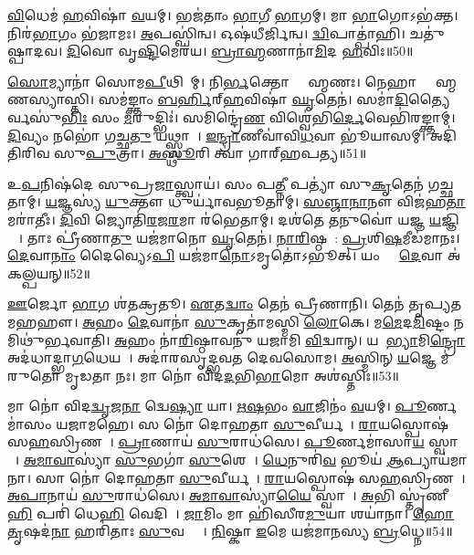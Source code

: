 \ul{𑌵𑌿}𑌧𑍇𑌮॑ \ul{𑌹}𑌵𑌿𑌷𑌾॑ \ul{𑌵}𑌯𑌮𑍍।
𑌭𑌜॑𑌤𑌾𑌂 \ul{𑌭𑌾}𑌗𑍀 \ul{𑌭𑌾}𑌗𑌮𑍍।
𑌮𑌾 \ul{𑌭𑌾}𑌗𑍋\-𑌽𑌭॑𑌕𑍍𑌤।
𑌨𑌿𑌰॑\ul{𑌭𑌾}𑌗𑌂 𑌭॑𑌜𑌾𑌮𑌃।
\ul{𑌅}𑌪𑌸𑍍𑌪𑌿॑𑌨𑍍𑌵।
𑌓𑌷॑𑌧𑍀𑌰𑍍𑌜𑌿𑌨𑍍𑌵।
\ul{𑌦𑍍𑌵𑌿}𑌪𑌾𑌤𑍍𑌪𑌾॑𑌹𑌿।
𑌚𑌤𑍁॑𑌷𑍍𑌪𑌾𑌦𑌵।
\ul{𑌦𑌿}𑌵𑍋 𑌵𑍃\ul{𑌷𑍍𑌟𑌿}𑌮𑍇𑌰॑𑌯।
\ul{𑌬𑍍𑌰𑌾}\ul{𑌹𑍍𑌮}𑌣𑌾𑌨𑌾॑\ul{𑌮𑌿}𑌦 \ul{𑌹}𑌵𑌿𑌃॥50॥

\ul{𑌸𑍋}𑌮𑍍𑌯𑌾𑌨𑌾॑ 𑌸𑍋𑌮\ul{𑌪𑍀}𑌥𑌿𑌨𑌾᳚𑌮𑍍।
𑌨𑌿\ul{𑌰𑍍𑌭}𑌕𑍍𑌤𑍋 𑌬𑍍𑌰𑌾᳚𑌹𑍍𑌮𑌣𑌃।
𑌨𑍇𑌹𑌾 𑌬𑍍𑌰𑌾᳚𑌹𑍍𑌮𑌣𑌸𑍍𑌯𑌾𑌸𑍍𑌤𑌿।
𑌸𑌮॑𑌙𑍍𑌕𑍍𑌤𑌾𑌂 \ul{𑌬}\ul{𑌰𑍍}𑌹𑌿𑌰𑍍‌\mbox{}\ul{𑌹}𑌵𑌿𑌷𑌾॑ \ul{𑌘𑍃}𑌤𑍇𑌨॑।
𑌸𑌮𑌾॑\ul{𑌦𑌿}𑌤𑍍𑌯𑍈𑌰𑍍𑌵𑌸𑍁॑\ul{𑌭𑌿𑌃} 𑌸𑌂 \ul{𑌮}𑌰𑍁𑌦𑍍𑌭𑌿𑌃॑।
𑌸𑌮𑌿𑌨𑍍𑌦𑍍𑌰𑍇॑\ul{𑌣} 𑌵𑌿𑌶𑍍𑌵𑍇॑𑌭𑌿\ul{𑌰𑍍𑌦𑍇}𑌵𑍇𑌭𑌿॑𑌰𑌙𑍍𑌕𑍍𑌤𑌾𑌮𑍍।
\ul{𑌦𑌿}𑌵𑍍𑌯𑌂 𑌨𑌭𑍋॑ 𑌗𑌚𑍍𑌛\ul{𑌤𑍁} 𑌯𑌥𑍍𑌸𑍍𑌵𑌾𑌹𑌾᳚।
\ul{𑌇}\ul{𑌨𑍍𑌦𑍍𑌰𑌾}𑌣𑍀𑌵𑌾॑𑌵𑌿\ul{𑌧}𑌵𑌾 𑌭𑍂॑𑌯𑌾𑌸𑌮𑍍।
𑌅𑌦𑌿॑𑌤𑌿𑌰𑌿𑌵 𑌸𑍁\ul{𑌪𑍁}𑌤𑍍𑌰𑌾।
\ul{𑌅}\ul{𑌸𑍍𑌥𑍂}𑌰𑌿 𑌤𑍍𑌵𑌾॑ 𑌗𑌾𑌰𑍍‌\mbox{}𑌹𑌪𑌤𑍍𑌯॥51॥

𑌉\ul{𑌪}𑌨𑌿𑌷॑𑌦𑍇 𑌸𑍁𑌪𑍍𑌰\ul{𑌜𑌾}𑌸𑍍𑌤𑍍𑌵𑌾𑌯॑।
𑌸𑌂 𑌪\ul{𑌤𑍍𑌨𑍀} 𑌪𑌤𑍍𑌯𑌾॑ 𑌸𑍁\ul{𑌕𑍃}𑌤𑍇𑌨॑ 𑌗𑌚𑍍𑌛𑌤𑌾𑌮𑍍।
\ul{𑌯}𑌜𑍍𑌞𑌸𑍍𑌯॑ \ul{𑌯𑍁}𑌕𑍍𑌤𑍗 𑌧𑍁𑌰𑍍𑌯𑌾॑𑌵𑌭𑍂𑌤𑌾𑌮𑍍।
\ul{𑌸}\ul{𑌞𑍍𑌜𑌾}\ul{𑌨𑌾}𑌨𑍗 𑌵𑌿𑌜॑𑌹\ul{𑌤𑌾}𑌮𑌰𑌾॑𑌤𑍀𑌃।
\ul{𑌦𑌿}𑌵𑌿 𑌜𑍍𑌯𑍋𑌤𑌿॑\ul{𑌰}𑌜\ul{𑌰}𑌮𑌾 𑌰॑𑌭𑍇𑌤𑌾𑌮𑍍।
𑌦𑌶॑𑌤𑍇 \ul{𑌤}𑌨𑍁𑌵𑍋॑ 𑌯𑌜𑍍𑌞 \ul{𑌯}𑌜𑍍𑌞𑌿𑌯𑌾𑌃᳚।
𑌤𑌾𑌃 𑌪𑍍𑌰𑍀॑𑌣𑌾\ul{𑌤𑍁} 𑌯𑌜॑𑌮𑌾𑌨𑍋 \ul{𑌘𑍃}𑌤𑍇𑌨॑।
\ul{𑌨𑌾}\ul{𑌰𑌿}𑌷𑍍𑌠𑌯𑍋᳚: \ul{𑌪𑍍𑌰}𑌶𑌿\ul{𑌷}𑌮𑍀𑌡॑𑌮𑌾𑌨𑌃।
\ul{𑌦𑍇}𑌵𑌾\ul{𑌨𑌾𑌂} 𑌦𑍈𑌵𑍍𑌯𑍇𑌽\ul{𑌪𑌿} 𑌯𑌜॑𑌮𑌾\ul{𑌨𑍋}\-𑌽𑌮𑍃𑌤𑍋॑\-𑌽𑌭𑍂𑌤𑍍।
𑌯𑌂 𑌵𑌾𑌂᳚ \ul{𑌦𑍇}𑌵𑌾 𑌅॑𑌕𑌲𑍍𑌪𑌯𑌨𑍍॥52॥

\ul{𑌊}𑌰𑍍𑌜𑍋 \ul{𑌭𑌾}𑌗 𑌶॑𑌤𑌕𑍍𑌰𑌤𑍂।
\ul{𑌏}𑌤\ul{𑌦𑍍𑌵𑌾𑌂} 𑌤𑍇𑌨॑ 𑌪𑍍𑌰𑍀𑌣𑌾𑌨𑌿।
𑌤𑍇𑌨॑ 𑌤𑍃𑌪𑍍𑌯𑌤𑌮𑌹𑌹𑍗।
\ul{𑌅}𑌹𑌂 \ul{𑌦𑍇}𑌵𑌾𑌨𑌾॑ \ul{𑌸𑍁}𑌕𑍃𑌤𑌾॑𑌮𑌸𑍍𑌮𑌿 \ul{𑌲𑍋}𑌕𑍇।
𑌮\ul{𑌮𑍇}𑌦\ul{𑌮𑌿}𑌷𑍍𑌟𑌂 𑌨 𑌮𑌿𑌥𑍁॑𑌰𑍍𑌭𑌵𑌾𑌤𑌿।
\ul{𑌅}𑌹𑌂 𑌨𑌾॑\ul{𑌰𑌿}𑌷𑍍𑌠𑌾𑌵𑌨𑍁॑ 𑌯𑌜𑌾𑌮𑌿 \ul{𑌵𑌿}𑌦𑍍𑌵𑌾𑌨𑍍।
𑌯𑌦𑌾᳚\ul{𑌭𑍍𑌯𑌾}𑌮𑌿\ul{𑌨𑍍𑌦𑍍𑌰𑍋} 𑌅𑌦॑𑌧𑌾𑌦𑍍𑌭𑌾\ul{𑌗}𑌧𑍇𑌯𑌮𑍍᳚।
𑌅𑌦𑌾॑𑌰𑌸𑍃𑌦𑍍𑌭𑌵𑌤 𑌦𑍇𑌵𑌸𑍋𑌮।
\ul{𑌅}𑌸𑍍𑌮𑌿𑌨𑍍 \ul{𑌯}𑌜𑍍𑌞𑍇 𑌮॑𑌰𑍁𑌤𑍋 𑌮𑍃𑌡𑌤𑌾 𑌨𑌃।
𑌮𑌾 𑌨𑍋॑ 𑌵𑌿𑌦\ul{𑌦}𑌭𑌿\ul{𑌭𑌾}𑌮𑍋 𑌅𑌶॑𑌸𑍍𑌤𑌿𑌃॥53॥

𑌮𑌾 𑌨𑍋॑ 𑌵𑌿𑌦\ul{𑌦𑍍𑌵𑍃}𑌜\ul{𑌨𑌾} 𑌦𑍍𑌵𑍇\ul{𑌷𑍍𑌯𑌾} 𑌯𑌾।
\ul{𑌋}\ul{𑌷}𑌭𑌂 \ul{𑌵𑌾}𑌜𑌿𑌨𑌂॑ \ul{𑌵}𑌯𑌮𑍍।
\ul{𑌪𑍂}𑌰𑍍𑌣𑌮𑌾॑𑌸𑌂 𑌯𑌜𑌾𑌮𑌹𑍇।
𑌸 𑌨𑍋॑ 𑌦𑍋𑌹𑌤𑌾 \ul{𑌸𑍁}𑌵𑍀𑌰𑍍𑌯𑌮𑍍᳚।
\ul{𑌰𑌾}𑌯𑌸𑍍𑌪𑍋𑌷॑ 𑌸\ul{𑌹}𑌸𑍍𑌰𑌿𑌣𑌮𑍍᳚।
\ul{𑌪𑍍𑌰𑌾}𑌣𑌾𑌯॑ \ul{𑌸𑍁}𑌰𑌾𑌧॑𑌸𑍇।
\ul{𑌪𑍂}𑌰𑍍𑌣𑌮𑌾॑𑌸𑌾\ul{𑌯} 𑌸𑍍𑌵𑌾𑌹𑌾᳚।
\ul{𑌅}\ul{𑌮𑌾}\ul{𑌵𑌾}𑌸𑍍𑌯𑌾॑ \ul{𑌸𑍁}𑌭𑌗𑌾॑ \ul{𑌸𑍁}𑌶𑍇𑌵𑌾᳚।
\ul{𑌧𑍇}𑌨𑍁𑌰𑌿॑\ul{𑌵} 𑌭𑍂𑌯॑ \ul{𑌆}𑌪𑍍𑌯𑌾𑌯॑𑌮𑌾𑌨𑌾।
𑌸𑌾 𑌨𑍋॑ 𑌦𑍋𑌹𑌤𑌾 \ul{𑌸𑍁}𑌵𑍀𑌰𑍍𑌯𑌮𑍍᳚।
\ul{𑌰𑌾}𑌯𑌸𑍍𑌪𑍋𑌷॑ 𑌸\ul{𑌹}𑌸𑍍𑌰𑌿𑌣𑌮𑍍᳚।
\ul{𑌅}\ul{𑌪𑌾}𑌨𑌾𑌯॑ \ul{𑌸𑍁}𑌰𑌾𑌧॑𑌸𑍇।
\ul{𑌅}\ul{𑌮𑌾}\ul{𑌵𑌾}𑌸𑍍𑌯𑌾॑\ul{𑌯𑍈} 𑌸𑍍𑌵𑌾𑌹𑌾᳚।
\ul{𑌅}𑌭𑌿 𑌸𑍍𑌤𑍃॑𑌣𑍀\ul{𑌹𑌿} 𑌪𑌰𑌿॑ 𑌧𑍇\ul{𑌹𑌿} 𑌵𑍇𑌦𑌿𑌮𑍍᳚।
\ul{𑌜𑌾}𑌮𑌿𑌂 𑌮𑌾 𑌹𑌿॑𑌸𑍀𑌰\ul{𑌮𑍁}𑌯𑌾 𑌶𑌯𑌾॑𑌨𑌾।
\ul{𑌹𑍋}\ul{𑌤𑍃}𑌷𑌦॑\ul{𑌨𑌾} 𑌹𑌰𑌿॑𑌤𑌾𑌃 \ul{𑌸𑍁}𑌵𑌰𑍍𑌣𑌾𑌃᳚।
\ul{𑌨𑌿}𑌷𑍍𑌕𑌾 \ul{𑌇}𑌮𑍇 𑌯𑌜॑𑌮𑌾𑌨𑌸𑍍𑌯 \ul{𑌬𑍍𑌰}𑌧𑍍𑌨𑍇॥54॥


